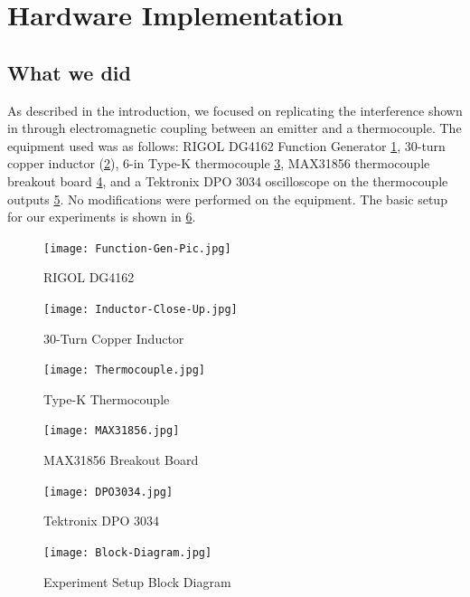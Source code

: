 \section{Hardware Implementation}\label{hwi}
\subsection{What we did}\label{wwd}
As described in the introduction, we focused on replicating the interference shown in \cite{Fu18} through electromagnetic coupling between an emitter and a thermocouple. The equipment used was as follows: RIGOL DG4162 Function Generator \cref{fig:FGen}, 30-turn copper inductor (\cref{fig:Inductor}), 6-in Type-K thermocouple \cref{fig:Thermocouple}, MAX31856 thermocouple breakout board \cref{fig:MAX31856}, and a Tektronix DPO 3034 oscilloscope on the thermocouple outputs \cref{fig:DPO3034}. No modifications were performed on the equipment. The basic setup for our experiments is shown in \cref{fig:Block}.

\begin{figure}
    \centering
    \texttt{[image: Function-Gen-Pic.jpg]}
    \caption{RIGOL DG4162}
    \label{fig:FGen}
\end{figure}
\begin{figure}
    \centering
    \texttt{[image: Inductor-Close-Up.jpg]}
    \caption{30-Turn Copper Inductor}
    \label{fig:Inductor}
\end{figure}
\begin{figure}
    \centering
    \texttt{[image: Thermocouple.jpg]}
    \caption{Type-K Thermocouple}
    \label{fig:Thermocouple}
\end{figure}
\begin{figure}
    \centering
    \texttt{[image: MAX31856.jpg]}
    \caption{MAX31856 Breakout Board}
    \label{fig:MAX31856}
\end{figure}
\begin{figure}
    \centering
    \texttt{[image: DPO3034.jpg]}
    \caption{Tektronix DPO 3034}
    \label{fig:DPO3034}
\end{figure}
\begin{figure}
    \centering
    \texttt{[image: Block-Diagram.jpg]}
    \caption{Experiment Setup Block Diagram}
    \label{fig:Block}
\end{figure}

